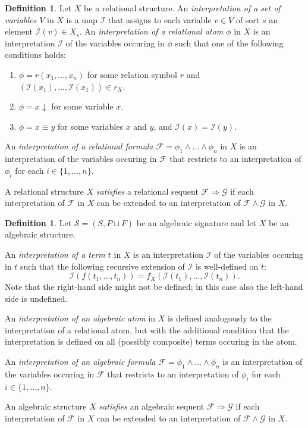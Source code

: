 \documentclass[a4paper]{article}
\theoremstyle{remark}
\theoremstyle{definition}
\newtheorem{definition}[theorem]{Definition}
\begin{document}
\begin{definition}
  \label{def:relational-semantics}
  Let $X$ be a relational structure.
  An \emph{interpretation of a set of variables $V$} in $X$ is a map $\mathcal{I}$ that assigns to each variable $v \in V$ of sort $s$ an element $\mathcal{I}(v) \in X_s$.
  An \emph{interpretation of a relational atom $\phi$} in $X$ is an interpretation $\mathcal{I}$ of the variables occuring in $\phi$ such that one of the following conditions holds:
  \begin{enumerate}
    \item
      $\phi = r(x_1, \dots, x_n)$ for some relation symbol $r$ and $(\mathcal{I}(x_1), \dots, \mathcal{I}(x_1)) \in r_X$.
    \item
      $\phi = x \downarrow$ for some variable $x$.
    \item
      $\phi = x \equiv y$ for some variables $x$ and $y$, and $\mathcal{I}(x) = \mathcal{I}(y)$.
  \end{enumerate}
  An \emph{interpretation of a relational formula $\mathcal{F} = \phi_1 \land \dots \land \phi_n$} in $X$ is an interpretation of the variables occuring in $\mathcal{F}$ that restricts to an interpretation of $\phi_i$ for each $i \in \{1, \dots, n\}$.

  A relational structure $X$ \emph{satisfies} a relational sequent $\mathcal{F} \Rightarrow \mathcal{G}$ if each interpretation of $\mathcal{F}$ in $X$ can be extended to an interpretation of $\mathcal{F} \land \mathcal{G}$ in $X$.
\end{definition}

\begin{definition}
  Let $\mathcal{S} = (S, P \sqcup F)$ be an algebraic signature and let $X$ be an algebraic structure.

  An \emph{interpretation of a term $t$} in $X$ is an interpretation $\mathcal{I}$ of the variables occuring in $t$ such that the following recursive extension of $\mathcal{I}$ is well-defined on $t$:
  \begin{equation}
    \mathcal{I}(f(t_1, \dots, t_n)) = f_X(\mathcal{I}(t_1), \dots, \mathcal{I}(t_n)).
  \end{equation}
  Note that the right-hand side might not be defined; in this case also the left-hand side is undefined.

  An \emph{interpretation of an algebraic atom} in $X$ is defined analogously to the interpretation of a relational atom, but with the additional condition that the interpretation is defined on all (possibly composite) terms occuring in the atom.

  An \emph{interpretation of an algebraic formula $\mathcal{F} = \phi_1 \land \dots \land \phi_n$} is an interpretation of the variables occuring in $\mathcal{F}$ that restricts to an interpretation of $\phi_i$ for each $i \in \{1, \dots, n\}$.

  An algebraic structure $X$ \emph{satisfies} an algebraic sequent $\mathcal{F} \Rightarrow \mathcal{G}$ if each interpretation of $\mathcal{F}$ in $X$ can be extended to an interpretation of $\mathcal{F} \land \mathcal{G}$ in $X$.
\end{definition}
\end{document}
